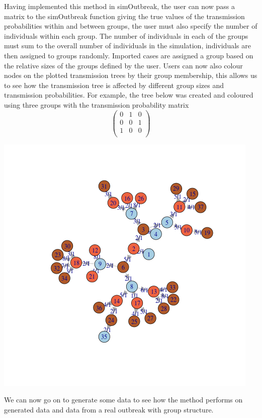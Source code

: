 \documentclass[11pt,a4paper]{report}
\begin{document}
Having implemented this method in simOutbreak, the user can now pass a matrix to the simOutbreak function giving the true values of the transmission probabilities within and between groups, the user must also specify the number of individuals within each group. The number of individuals in each of the groups must sum to the overall number of individuals in the simulation, individuals are then assigned to groups randomly. Imported cases are assigned a group based on the relative sizes of the groups defined by the user. Users can now also colour nodes on the plotted transmission trees by their group membership, this allows us to see how the transmission tree is affected by different group sizes and transmission probabilities. For example, the tree below was created and coloured using three groups with the transmission probability matrix
\[ \left( \begin{array}{ccc}
0 & 1 & 0 \\
0 & 0 & 1 \\
1 & 0 & 0 \\
\end{array} \right) \]
\begin{center}
\includegraphics[scale=0.8]{treexample.png}
\end{center}
We can now go on to generate some data to see how the method performs on generated data and data from a real outbreak with group structure.
\end{document}
